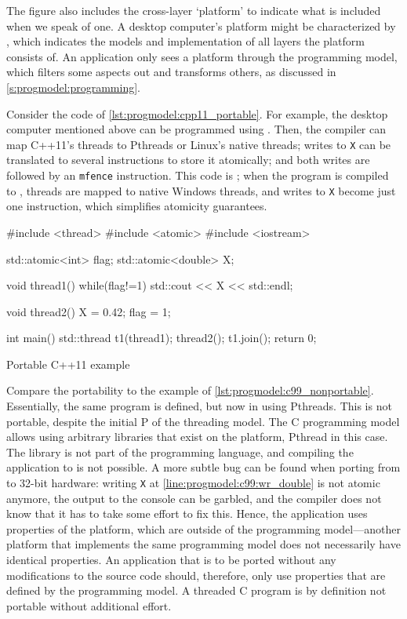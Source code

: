 The figure \chapfigpageref also includes the cross-layer `platform' to indicate what is included when we speak of one.
A desktop computer's platform might be characterized by , which indicates the models and implementation of all layers the platform consists of.
An application only sees a platform through the programming model, which filters some aspects out and transforms others, as discussed in \cref{s:progmodel:programming}.

Consider the code of \vref{lst:progmodel:cpp11_portable}.
For example, the desktop computer mentioned above can be programmed using .
Then, the compiler can map C++11's threads to Pthreads or Linux's native threads; writes to \lstinline|X| can be translated to several instructions to store it atomically; and both writes are followed by an \lstinline|mfence| instruction.
This code is ; when the program is compiled to , threads are mapped to native Windows threads, and writes to \lstinline|X| become just one instruction, which simplifies atomicity guarantees.

\begin{lstcols}{2}%
\begin{lstcode}[variable={flag,X,t1,cout,endl},type={std,thread,atomic}]
#include <thread>
#include <atomic>
#include <iostream>

std::atomic<int> flag;
std::atomic<double> X;

void thread1(){
	while(flag!=1){}
	std::cout << X << std::endl;
}

void thread2(){
	X = 0.42;
	flag = 1;
}

int main(){
	std::thread t1(thread1);
	thread2();
	t1.join();
	return 0;
}
\end{lstcode}%
\caption{Portable C++11 example}%
\label{lst:progmodel:cpp11_portable}%
\end{lstcols}

Compare the portability to the example of \cref{lst:progmodel:c99_nonportable}.
Essentially, the same program is defined, but now in  using Pthreads.
This is not portable, despite the initial P of the threading model.
The C programming model allows using arbitrary libraries that exist on the platform, Pthread in this case.
The  library is not part of the programming language, and compiling the application to  is not possible.
A more subtle bug can be found when porting from  to 32-bit hardware: writing \lstinline|X| at \cref{line:progmodel:c99:wr_double} is not atomic anymore, the output to the console can be garbled, and the compiler does not know that it has to take some effort to fix this.
Hence, the application uses properties of the platform, which are outside of the programming model---another platform that implements the same programming model does not necessarily have identical properties.
An application that is to be ported without any modifications to the source code should, therefore, only use properties that are defined by the programming model.
A threaded C program is by definition not portable without additional effort.

